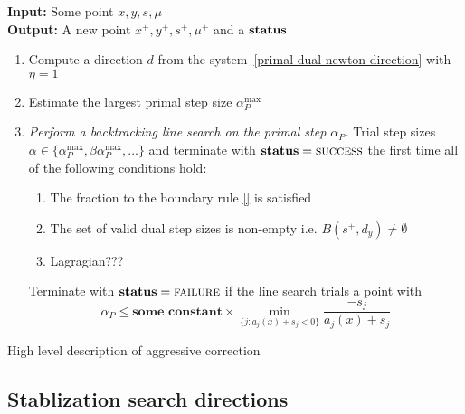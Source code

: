 \documentclass{article}
\begin{document}
\begin{algorithm}[H]
\textbf{Input:} Some point $x, y, s, \mu$ \\
\textbf{Output:} A new point $x^{+}, y^{+}, s^{+}, \mu^{+}$ and a $\textbf{status}$
\begin{enumerate}[label*=A.{\arabic*}]
\item Compute a direction $d$ from the system~\eqref{primal-dual-newton-direction} with $\eta = 1$
\item Estimate the largest primal step size $\alpha^{\max}_{P}$
\item \emph{Perform a backtracking line search on the primal step $\alpha_{P}$.} Trial step sizes $\alpha \in \{\alpha^{\max}_{P}, \beta \alpha^{\max}_{P}, ... \}$ and terminate with $\textbf{status} = \textsc{success}$ the first time all of the following conditions hold:
\begin{enumerate}[label=({\roman*})] 
\item The fraction to the boundary rule \eqref{} is satisfied 
\item The set of valid dual step sizes is non-empty i.e. $B( s^{+}, d_{y} ) \neq \emptyset$ 
\item Lagragian???
\end{enumerate}
Terminate with $\textbf{status} = \textsc{failure}$ if the line search trials a point with
 $$
\alpha_{P} \le \textbf{some constant} \times \min_{\{ j : a_j(x) + s_j < 0 \}}{ \frac{ -s_j }{ a_j(x) + s_j} }
$$
\end{enumerate}
\caption{High level description of aggressive correction}\label{alg:aggressive}
\end{algorithm}

\subsection{Stablization search directions}
\end{document}
